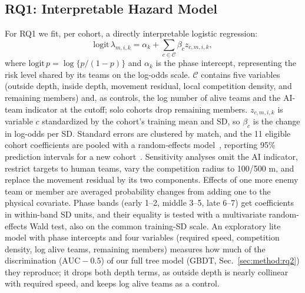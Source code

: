 \documentclass[sigconf,anonymous,nonacm]{acmart}
\begin{document}
\subsection{RQ1: Interpretable Hazard Model}
\label{sec:method:rq1}
For RQ1 we fit, per cohort, a directly interpretable logistic regression:
\begin{equation}
\mathrm{logit}\,\lambda_{m,i,k}=\alpha_k+\textstyle\sum_{c\in\mathcal{C}}\beta_c z_{c,m,i,k},
\label{eq:ehm}
\end{equation}
where $\mathrm{logit}\,p=\log\{p/(1-p)\}$ and $\alpha_k$ is the phase intercept, representing the risk level shared by its teams on the log-odds scale.
$\mathcal{C}$ contains five variables (outside depth, inside depth, movement residual, local competition density, and remaining members) and, as controls, the log number of alive teams and the AI-team indicator at the cutoff; solo cohorts drop remaining members.
$z_{c,m,i,k}$ is variable $c$ standardized by the cohort's training mean and SD, so $\beta_c$ is the change in log-odds per SD.
Standard errors are clustered by match, and the 11 eligible cohort coefficients are pooled with a random-effects model~\cite{DerSimonian86}, reporting 95\% prediction intervals for a new cohort~\cite{Higgins09}. Sensitivity analyses omit the AI indicator, restrict targets to human teams, vary the competition radius to 100/500 m, and replace the movement residual by its two components. Effects of one more enemy team or member are averaged probability changes from adding one to the physical covariate.
Phase bands (early 1--2, middle 3--5, late 6--7) get coefficients in within-band SD units, and their equality is tested with a multivariate random-effects Wald test, also on the common training-SD scale.
An exploratory lite model with phase intercepts and four variables (required speed, competition density, log alive teams, remaining members) measures how much of the discrimination ($\mathrm{AUC}-0.5$) of our full tree model (GBDT, Sec.~\ref{sec:method:rq2}) they reproduce; it drops both depth terms, as outside depth is nearly collinear with required speed, and keeps log alive teams as a control.
\end{document}
